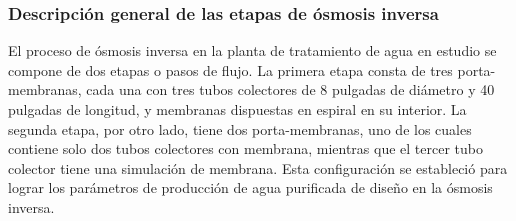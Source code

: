 \subsubsection{Descripción general de las etapas de ósmosis inversa}

El proceso de ósmosis inversa en la planta de tratamiento de agua en estudio se compone de dos etapas o pasos de flujo. La primera etapa consta de tres porta-membranas, cada una con tres tubos colectores de 8 pulgadas de diámetro y 40 pulgadas de longitud, y membranas dispuestas en espiral en su interior. La segunda etapa, por otro lado, tiene dos porta-membranas, uno de los cuales contiene solo dos tubos colectores con membrana, mientras que el tercer tubo colector tiene una simulación de membrana. Esta configuración se estableció para lograr los parámetros de producción de agua purificada de diseño en la ósmosis inversa.
